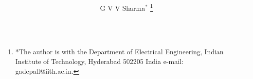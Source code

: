 \documentclass[journal,12pt,onecolumn]{IEEEtran}
\begin{document}
\title{	}
%
%
%

\author{G V V Sharma$^{*}$%
\thanks{*The author is with the Department
of Electrical Engineering, Indian Institute of Technology, Hyderabad
502205 India e-mail:  gadepall@iith.ac.in.}%
}
% 
%



% 
\end{document}
